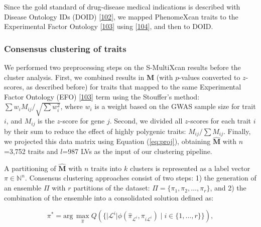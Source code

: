 \documentclass[
  legalpaperpaper,
]{article}
\begin{document}
Since the gold standard of drug-disease medical indications is described with Disease Ontology IDs (DOID) {[}\protect\hyperlink{ref-1FsruosUW}{102}{]}, we mapped PhenomeXcan traits to the Experimental Factor Ontology {[}\protect\hyperlink{ref-9okjVu3s}{103}{]} using {[}\protect\hyperlink{ref-16RTdMKxI}{104}{]}, and then to DOID.

\hypertarget{sec:methods:clustering}{%
\subsubsection{Consensus clustering of traits}\label{sec:methods:clustering}}

We performed two preprocessing steps on the S-MultiXcan results before the cluster analysis.
First, we combined results in \(\mathbf{M}\) (with \(p\)-values converted to \(z\)-scores, as described before) for traits that mapped to the same Experimental Factor Ontology (EFO) {[}\protect\hyperlink{ref-9okjVu3s}{103}{]} term using the Stouffer's method: \(\sum w_i M_{ij} / \sqrt{\sum w_i^2}\), where \(w_i\) is a weight based on the GWAS sample size for trait \(i\), and \(M_{ij}\) is the \(z\)-score for gene \(j\).
Second, we divided all \(z\)-scores for each trait \(i\) by their sum to reduce the effect of highly polygenic traits: \(M_{ij} / \sum M_{ij}\).
Finally, we projected this data matrix using Equation (\ref{eq:proj}), obtaining \(\hat{\mathbf{M}}\) with \(n\)=3,752 traits and \(l\)=987 LVs as the input of our clustering pipeline.

A partitioning of \(\hat{\mathbf{M}}\) with \(n\) traits into \(k\) clusters is represented as a label vector \(\pi \in \mathbb{N}^n\).
Consensus clustering approaches consist of two steps:
1) the generation of an ensemble \(\Pi\) with \(r\) partitions of the dataset: \(\Pi=\{\pi_1, \pi_2, \ldots, \pi_r\}\),
and 2) the combination of the ensemble into a consolidated solution defined as:

\begin{equation}
\pi^* = \mathrm{arg}\,\underset{\hat{\pi}}{\max} Q(\{ \lvert \mathcal{L}^i \lvert \phi(\hat{\pi}_{\mathcal{L}^i}, \pi_{i \mathcal{L}^i}) \mid i \in \{1,\ldots,r\} \}),
\label{eq:consensus:obj_func}\end{equation}
\end{document}
